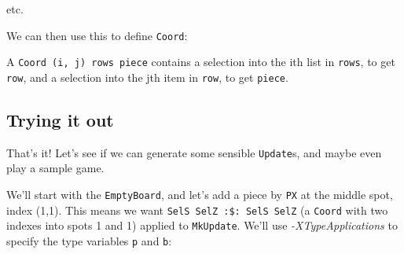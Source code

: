 \documentclass[]{article}
\newenvironment{Shaded}{}{}
\newcommand{\CommentTok}[1]{\textcolor[rgb]{0.38,0.63,0.69}{\textit{#1}}}
\newcommand{\DataTypeTok}[1]{\textcolor[rgb]{0.56,0.13,0.00}{#1}}
\newcommand{\KeywordTok}[1]{\textcolor[rgb]{0.00,0.44,0.13}{\textbf{#1}}}
\newcommand{\NormalTok}[1]{#1}
\newcommand{\OperatorTok}[1]{\textcolor[rgb]{0.40,0.40,0.40}{#1}}
\newcommand{\OtherTok}[1]{\textcolor[rgb]{0.00,0.44,0.13}{#1}}
\begin{document}
etc.

We can then use this to define \texttt{Coord}:

\begin{Shaded}
\end{Shaded}

A \texttt{Coord\ \textquotesingle{}(i,\ j)\ rows\ piece} contains a selection
into the ith list in \texttt{rows}, to get \texttt{row}, and a selection into
the jth item in \texttt{row}, to get \texttt{piece}.

\hypertarget{trying-it-out}{%
\subsection{Trying it out}\label{trying-it-out}}

That's it! Let's see if we can generate some sensible \texttt{Update}s, and
maybe even play a sample game.

We'll start with the \texttt{EmptyBoard}, and let's add a piece by \texttt{PX}
at the middle spot, index (1,1). This means we want
\texttt{SelS\ SelZ\ :\$:\ SelS\ SelZ} (a \texttt{Coord} with two indexes into
spots 1 and 1) applied to \texttt{MkUpdate}. We'll use \emph{-XTypeApplications}
to specify the type variables \texttt{p} and \texttt{b}:
\end{document}
